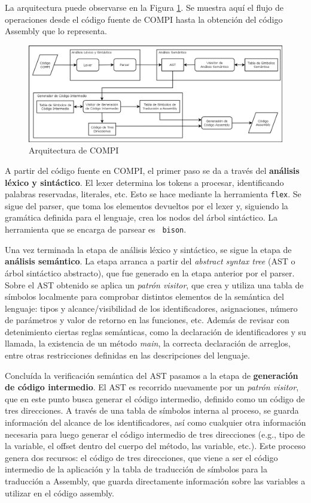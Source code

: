 \documentclass[12pt, a4paper, titlepage]{article}
\begin{document}
  La arquitectura puede observarse en la Figura \ref{fig:architecture}. Se
  muestra aquí el flujo de operaciones desde el código fuente de COMPI hasta la
  obtención del código Assembly que lo representa.

  \begin{figure}[h]
    \centering
    \includegraphics[width=\textwidth]{architecture.png}
    \caption{Arquitectura de COMPI}
    \label{fig:architecture}
  \end{figure}

  A partir del código fuente en COMPI, el primer paso se da a través del {\bf
  análisis léxico y sintáctico}. El lexer determina los tokens a procesar,
  identificando palabras reservadas, literales, etc. Esto se hace mediante la
  herramienta {\tt flex}. Se sigue del parser, que toma los elementos devueltos
  por el lexer y, siguiendo la gramática definida para el lenguaje, crea los
  nodos del árbol sintáctico. La herramienta que se encarga de parsear es {\tt
  bison}.

  Una vez terminada la etapa de análisis léxico y sintáctico, se sigue la etapa
  de {\bf análisis semántico}. La etapa arranca a partir del {\em abstract
  syntax tree} (AST o árbol sintáctico abstracto), que fue generado en la etapa
  anterior por el parser. Sobre el AST obtenido se aplica un {\em patrón
  visitor}, que crea y utiliza una tabla de símbolos localmente para comprobar
  distintos elementos de la semántica del lenguaje: tipos y alcance/visibilidad
  de los identificadores, asignaciones, número de parámetros y valor de retorno
  en las funciones, etc. Además de revisar con detenimiento ciertas reglas
  semánticas, como la declaración de identificadores y su llamada, la existencia
  de un método {\em main}, la correcta declaración de arreglos, entre otras
  restricciones definidas en las descripciones del lenguaje.

  Concluída la verificación semántica del AST pasamos a la etapa de {\bf
  generación de código intermedio}. El AST es recorrido nuevamente por un {\em
  patrón visitor}, que en este punto busca generar el código intermedio,
  definido como un código de tres direcciones. A través de una tabla de símbolos
  interna al proceso, se guarda información del alcance de los identificadores,
  así como cualquier otra información necesaria para luego generar el código
  intermedio de tres direcciones (e.g., tipo de la variable, el offset dentro
  del cuerpo del método, las variable, etc.). Este proceso genera dos recursos:
  el código de tres direcciones, que viene a ser el código intermedio de la
  aplicación y la tabla de traducción de símbolos para la traducción a Assembly,
  que guarda directamente información sobre las variables a utilizar en el
  código assembly.
\end{document}
